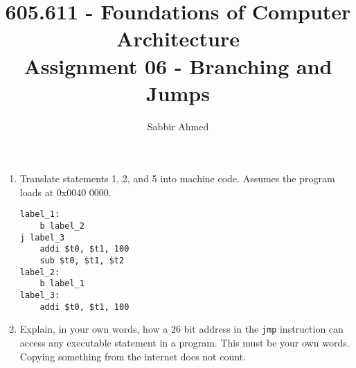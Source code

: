 \documentclass[12pt]{article}
\begin{document}
  \title{605.611 - Foundations of Computer Architecture \\ Assignment 06 - Branching and Jumps\vspace{-0.5em}}
  \author{Sabbir Ahmed}
  \maketitle
  \vspace{-1em}

  \begin{enumerate}

    \item Translate statements 1, 2, and 5 into machine code.  Assumes the program loads at 0x0040 0000.

    \begin{lstlisting}
label_1:
    b label_2
j label_3
    addi $t0, $t1, 100
    sub $t0, $t1, $t2
label_2:
    b label_1
label_3:
    addi $t0, $t1, 100
    \end{lstlisting}

    \item Explain, in your own words, how a 26 bit address in the \texttt{jmp} instruction can access any executable statement in a program. This must be your own words. Copying something from the internet does not count.

  \end{enumerate}
\end{document}
